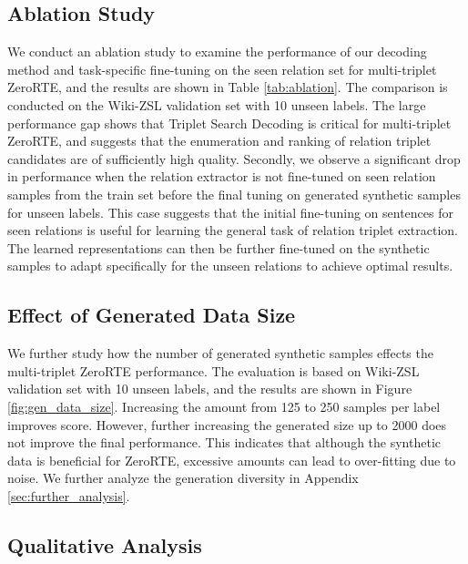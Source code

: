 \documentclass[11pt]{article}
\begin{document}
\subsection{Ablation Study}
We conduct an ablation study to examine the performance of our decoding method and task-specific fine-tuning on the seen relation set for multi-triplet ZeroRTE, and the results are shown in Table \ref{tab:ablation}. 
The comparison is conducted on the Wiki-ZSL validation set with 10 unseen labels.
The large performance gap shows that Triplet Search Decoding is critical for multi-triplet ZeroRTE, and suggests that the enumeration and ranking of relation triplet candidates are of sufficiently high quality.
Secondly, we observe a significant drop in performance when the relation extractor is not fine-tuned on seen relation samples from the train set before the final tuning on generated synthetic samples for unseen labels.
This case suggests that the initial fine-tuning on sentences for seen relations is useful for learning the general task of relation triplet extraction.
The learned representations can then be further fine-tuned on the synthetic samples to adapt specifically for the unseen relations to achieve optimal results.






\subsection{Effect of Generated Data Size}
We further study how the number of generated synthetic samples effects the multi-triplet ZeroRTE performance.
The evaluation is based on Wiki-ZSL validation set with 10 unseen labels, and the results are shown in Figure \ref{fig:gen_data_size}. 
Increasing the amount from 125 to 250 samples per label improves  score.
However, further increasing the generated size up to 2000 does not improve the final performance.
This indicates that although the synthetic data is beneficial for ZeroRTE, excessive amounts can lead to over-fitting due to noise.
We further analyze the generation diversity in Appendix \ref{sec:further_analysis}.


\subsection{Qualitative Analysis}
\label{sec:case}
\end{document}
